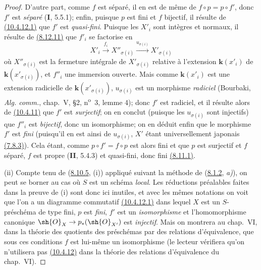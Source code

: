 \begin{proof}
D'autre part, comme $f$ est séparé, il en est de même de
$f\circ p=p\circ f'$, donc $f'$ est \emph{séparé} (\textbf{I}, 5.5.1); enfin, puisque
$p$ est fini et $f$ bijectif, il résulte de
{\hyperlink{ega4.c04.sec.10-4-12-1}{(10.4.12.1)}} que $f'$ est
\emph{quasi-fini}. Puisque les $X'_i$ sont intègres et normaux, il résulte de
{\hyperref[canon-index.ega4.c04.cor.8-12-11]{(8.12.11)}} que $f'_i$ se factorise en
\[
 X'_i\xrightarrow{f_i}X''_{\sigma(i)}
 \xrightarrow{u_{\sigma(i)}}X'_{\sigma(i)}
\]
où $X''_{\sigma(i)}$ est la fermeture intégrale de
$X'_{\sigma(i)}$ relative à l'extension $\boldsymbol{k}(x'_i)$ de
$\boldsymbol{k}(x'_{\sigma(i)})$, et $f''_i$ une immersion ouverte. Mais comme
$\boldsymbol{k}(x'_i)$ est une extension radicielle de $\boldsymbol{k}(x'_{\sigma(i)})$,
$u_{\sigma(i)}$ est un morphisme \emph{radiciel} (Bourbaki,
\emph{Alg. comm.}, chap.~V, \S2, n\textsuperscript{o}~3, lemme 4);
donc $f'$ est radiciel, et il résulte alors de
{\hyperref[canon-index.ega4.c04.statement.10-4-11]{(10.4.11)}} que $f'$ est
\emph{surjectif}; on en conclut (puisque les $u_{\sigma(i)}$ sont injectifs)
que $f''_i$ est \emph{bijectif}, donc un isomorphisme; on en déduit enfin que
le morphisme $f'$ est \emph{fini} (puisqu'il en est ainsi de $u_{\sigma(i)}$,
$X'$ étant universellement japonais
{\hyperref[canon-index.ega4.c04.statement.7-8-3]{(7.8.3)}}). Cela étant, comme
$p\circ f'=f\circ p$ est alors fini et que $p$ est surjectif et $f$
séparé, $f$ est propre (\textbf{II}, 5.4.3) et quasi-fini, donc fini
{\hyperref[canon-index.ega4.c04.thm.8-11-1]{(8.11.1)}}.

\textup{(ii)} Compte tenu de
({\hyperref[canon-index.ega4.c04.thm.8-10-5]{8.10.5}}, (i)) appliqué suivant la
méthode de ({\hyperref[canon-index.ega4.c04.statement.8-1-2]{8.1.2}}, \emph{a)}), on peut
se borner au cas où $S$ est un schéma \emph{local}. Les réductions préalables
faites dans la preuve de (i) sont donc ici inutiles, et avec les mêmes
notations on voit que l'on a un diagramme commutatif
{\hyperlink{ega4.c04.sec.10-4-12-1}{(10.4.12.1)}} dans lequel $X$ est
un $S$-préschéma de type fini, $p$ est \emph{fini}, $f'$ est un \emph{isomorphisme} et
l'homomorphisme canonique $\sh{O}_X\to p_*(\sh{O}_{X'})$ est \emph{injectif}.
Mais on montrera au chap.~VI, dans la théorie des quotients des
préschémas par des relations d'équivalence, que sous ces conditions $f$
est lui-même un isomorphisme (le lecteur vérifiera qu'on n'utilisera pas
{\hyperlink{ega4.c04.cor.10-4-12}{(10.4.12)}} dans la théorie des
relations d'équivalence du chap.~VI).
\end{proof}

